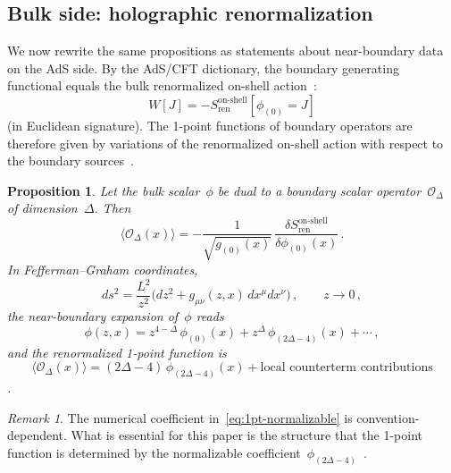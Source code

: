 \documentclass[
  aps,
  prd,
  preprint,
  groupedaddress,
  nofootinbib,
  longbibliography
]{revtex4-2}
\newtheorem{proposition}[definition]{Proposition}
\theoremstyle{remark}
\newtheorem{remark}[definition]{Remark}
\begin{document}
\subsection{Bulk side: holographic renormalization}\label{subsec:2-4}

We now rewrite the same propositions as statements about
near-boundary data on the AdS side.
By the AdS/CFT dictionary, the boundary generating functional
equals the bulk renormalized on-shell
action~\cite{ref2,ref3,ref9,ref10,ref11}:
\begin{equation}\label{eq:GKPW}
  W[J] = -S_{\mathrm{ren}}^{\mathrm{on\text{-}shell}}
    [\phi_{(0)}=J]
\end{equation}
(in Euclidean signature).
The 1-point functions of boundary operators are therefore
given by variations of the renormalized on-shell action with
respect to the boundary sources~\cite{ref9,ref10,ref11,ref12}.

\begin{proposition}\label{prop:bulk-scalar}
Let the bulk scalar~$\phi$ be dual to a boundary scalar
operator~$\mathcal{O}_\Delta$ of dimension~$\Delta$.
Then
\begin{equation}\label{eq:1pt-bulk-scalar}
  \langle\mathcal{O}_\Delta(x)\rangle
  = -\frac{1}{\sqrt{g_{(0)}(x)}}\,
    \frac{\delta S_{\mathrm{ren}}^{\mathrm{on\text{-}shell}}}
         {\delta\phi_{(0)}(x)}\,.
\end{equation}
In Fefferman--Graham coordinates,
\begin{equation}\label{eq:FG-metric}
  ds^2 = \frac{L^2}{z^2}\bigl(dz^2
    + g_{\mu\nu}(z,x)\,dx^\mu dx^\nu\bigr)\,,
  \qquad z\to 0\,,
\end{equation}
the near-boundary expansion of~$\phi$ reads
\begin{equation}\label{eq:phi-expansion}
  \phi(z,x) = z^{4-\Delta}\,\phi_{(0)}(x)
    + z^{\Delta}\,\phi_{(2\Delta-4)}(x) + \cdots\,,
\end{equation}
and the renormalized 1-point function is
\begin{equation}\label{eq:1pt-normalizable}
  \langle\mathcal{O}_\Delta(x)\rangle
  = (2\Delta-4)\,\phi_{(2\Delta-4)}(x)
    + \text{local counterterm contributions}
\end{equation}
\cite{ref9,ref10,ref11}.
\end{proposition}

\begin{remark}\label{rem:convention}
The numerical coefficient in~\eqref{eq:1pt-normalizable} is
convention-dependent.
What is essential for this paper is the structure that the
1-point function is determined by the normalizable
coefficient~$\phi_{(2\Delta-4)}$~\cite{ref9,ref10}.
\end{remark}
\end{document}
